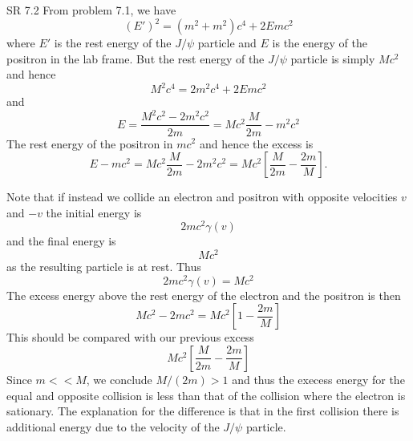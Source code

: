 \documentclass[minion]{homework}
\begin{document}
\begin{aproblems}


\hproblem SR 7.2
\solution
From problem 7.1, we have
\[
(E')^2 = (m^2+m^2)c^4 + 2Emc^2
\]
where $E'$ is the rest energy of the $J/\psi$ particle and
$E$ is the energy of the positron in the lab frame.  But the 
rest energy of the $J/\psi$ particle is simply $Mc^2$ and hence
\[
M^2c^4 = 2m^2c^4 + 2E mc^2 
\]
and
\[
E = \frac{M^2c^2- 2m^2 c^2}{2m} = Mc^2\frac{M}{2m} - m^2c^2
\]
The rest energy of the positron in $mc^2$ and hence the excess is
\[
E - mc^2 = Mc^2\frac{M}{2m} - 2m^2c^2 = Mc^2 \left[\frac{M}{2m} - \frac{2m}{M} \right].
\]


Note that if instead we collide an electron and positron with opposite velocities $v$ and $-v$
the initial energy is
\begin{equation}
2mc^2\gamma(v)
\end{equation}
and the final energy is
\begin{equation}
Mc^2
\end{equation}
as the resulting particle is at rest.  Thus
\begin{equation}
2mc^2\gamma(v) = Mc^2
\end{equation}
The excess energy above the rest energy of the electron and the positron is then
\[
Mc^2 - 2mc^2 = Mc^2 \left[1-\frac{2m}{M}\right]
\]
This should be compared with
our previous excess
\[
Mc^2 \left[\frac{M}{2m} - \frac{2m}{M} \right]
\]
Since $m<<M$, we conclude $M/(2m) > 1$ and thus the execess energy for the equal
and opposite collision is less than that of the collision where the electron
is sationary.  The explanation for the difference is that in the first collision
there is additional energy due to the velocity of the $J/\psi$ particle.


\end{aproblems}
\end{document}
